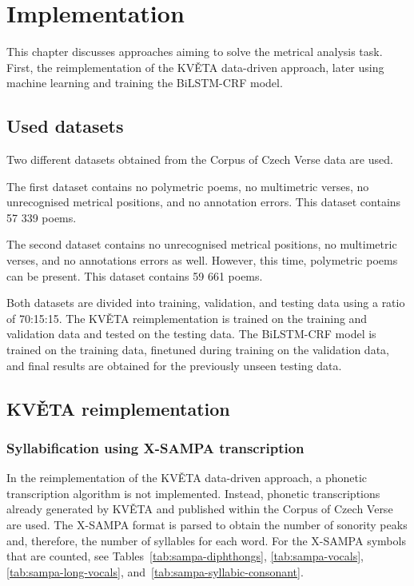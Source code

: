 \chapter{Implementation}\label{chap:implementation}
\begin{chapterabstract}
This chapter discusses approaches aiming to solve the metrical analysis task. First, the reimplementation of the KVĚTA data-driven approach, later using machine learning and training the BiLSTM-CRF model.
\end{chapterabstract}

\section{Used datasets}\label{section:used-data-sets}
Two different datasets obtained from the Corpus of Czech Verse data are used.

The first dataset contains no polymetric poems, no multimetric verses, no unrecognised metrical positions, and no annotation errors. This dataset contains 57 339 poems.

The second dataset contains no unrecognised metrical positions, no multimetric verses, and no annotations errors as well. However, this time, polymetric poems can be present. This dataset contains 59 661 poems.

Both datasets are divided into training, validation, and testing data using a ratio of 70:15:15. The KVĚTA reimplementation is trained on the training and validation data and tested on the testing data. The BiLSTM-CRF model is trained on the training data, finetuned during training on the validation data, and final results are obtained for the previously unseen testing data.

\section{KVĚTA reimplementation}
\subsection{Syllabification using X-SAMPA transcription}
In the reimplementation of the KVĚTA data-driven approach, a phonetic transcription algorithm is not implemented. Instead, phonetic transcriptions already generated by KVĚTA and published within the Corpus of Czech Verse are used. The X-SAMPA format is parsed to obtain the number of sonority peaks and, therefore, the number of syllables for each word. For the X-SAMPA symbols that are counted, see Tables~\ref{tab:sampa-diphthongs}, \ref{tab:sampa-vocals}, \ref{tab:sampa-long-vocals}, and~\ref{tab:sampa-syllabic-consonant}.

